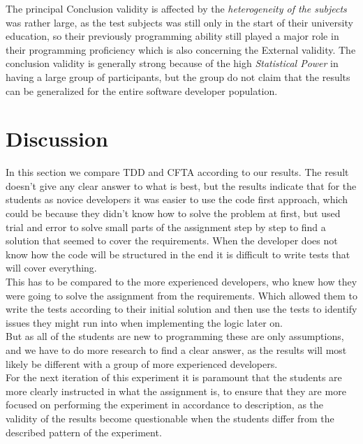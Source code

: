 \documentclass{sig-alternate-05-2015}
\begin{document}
The principal Conclusion validity is affected by the \textit{heterogeneity of the subjects} was rather large, as the test subjects was still only in the start of their university education, so their previously programming ability still played a major role in their programming proficiency which is also concerning the External validity. The conclusion validity is generally strong because of the high \textit{Statistical Power} in having a large group of participants, but the group do not claim that the results can be generalized for the entire software developer population. 

\section{Discussion}

In this section we compare TDD and CFTA according to our results. The result doesn’t give any clear answer to what is best, but the results indicate that for the students as novice developers it was easier to use the code first approach, which could be because they didn’t know how to solve the problem at first, but used trial and error to solve small parts of the assignment step by step to find a solution that seemed to cover the requirements. When the developer does not know how the code will be structured in the end it is difficult to write tests that will cover everything.\\

This has to be compared to the more experienced developers, who knew how they were going to solve the assignment from the requirements. Which allowed them to write the tests according to their initial solution and then use the tests to identify issues they might run into when implementing the logic later on.\\

But as all of the students are new to programming these are only assumptions, and we have to do more research to find a clear answer, as the results will most likely be different with a group of more experienced developers.\\

For the next iteration of this experiment it is paramount that the students are more clearly instructed in what the assignment is, to ensure that they are more focused on performing the experiment in accordance to description, as the validity of the results become questionable when the students differ from the described pattern of the experiment. \\
\end{document}
